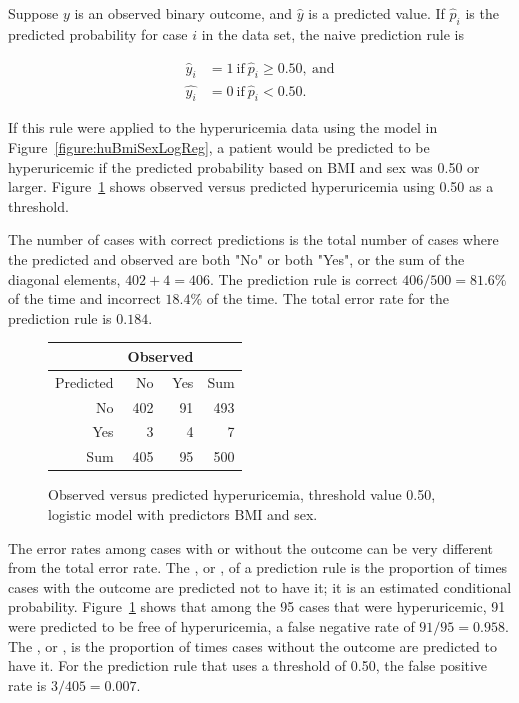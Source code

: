 Suppose $y$ is an observed binary outcome, and $\hat{y}$ is a predicted value. If $\hat{p}_i$ is the predicted probability for case $i$ in the data set, the naive prediction rule is 

\begin{align*}
   \hat{y}_i &= 1 \  \text{if}\  \hat{p}_i \geq 0.50, \  \text{and}\\
   \hat{y_i} &= 0 \ \text{if}\  \hat{p}_i < 0.50.
\end{align*} 

If this rule were applied to the hyperuricemia data using the model in Figure~\ref{figure:huBmiSexLogReg}, a patient would be predicted to be hyperuricemic if the predicted probability based on BMI and sex was 0.50 or larger.  Figure~\ref{figure:predVsObsHuBMISex} shows observed versus predicted hyperuricemia using 0.50 as a threshold.  

The number of cases with correct predictions is the total number of cases where the predicted and observed are both "No" or both "Yes", or the sum of the diagonal elements, $402 + 4 = 406$.  The prediction rule is correct $406/500 = 81.6\%$ of the time and 
incorrect $18.4\%$ of the time.  The total error rate for the prediction rule is $0.184$.

\begin{figure}[ht]
\centering
\begin{tabular}{rrrr}
  \hline
  & \multicolumn{2}{c}{Observed} & \\
  \hline
 Predicted& No & Yes & Sum \\ 
  \hline
No & 402 & 91 & 493 \\ 
Yes & 3 & 4 & 7 \\ 
  Sum & 405 & 95 & 500 \\ 
   \hline
\end{tabular}
\caption{Observed versus predicted hyperuricemia, 
       threshold value 0.50, logistic model with predictors BMI and sex.} 
\label{figure:predVsObsHuBMISex}
\end{figure}

The error rates among cases with or without the outcome can be very different from the total error rate. The , or , of a prediction rule is the proportion of times cases with the outcome are predicted not to have it; it is an estimated conditional probability.  Figure~\ref{figure:predVsObsHuBMISex} shows that among the 95 cases that were hyperuricemic, 91 were predicted to be free of hyperuricemia, a false negative rate of $91/95 = 0.958$. The , or , is the proportion of times cases without the outcome are predicted to have it. For the prediction rule that uses a threshold of 0.50, the false positive rate is $3/405 = 0.007$.   

